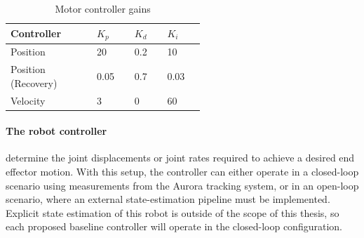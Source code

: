 \begin{table}[h]
    \centering
    \caption{Motor controller gains}
    \begin{tabular}{p{0.25\linewidth} | p{0.1\linewidth} | p{0.1\linewidth} | p{0.1\linewidth}}
        \textbf{Controller} & \textbf{$K_p$} & \textbf{$K_d$} & \textbf{$K_i$} \\
        \hline
        Position & 20 & 0.2 & 10 \\
        Position (Recovery) & 0.05 & 0.7 & 0.03 \\
        Velocity & 3 & 0 & 60 \\
    \end{tabular}
    \label{tab:motor_controller_gains}
\end{table}

\paragraph{The robot controller} determine the joint displacements or joint rates required to achieve a desired end effector motion. With this setup, the controller can either operate in a closed-loop scenario using measurements from the Aurora tracking system, or in an open-loop scenario, where an external state-estimation pipeline must be implemented. Explicit state estimation of this robot is outside of the scope of this thesis, so each proposed baseline controller will operate in the closed-loop configuration. 


